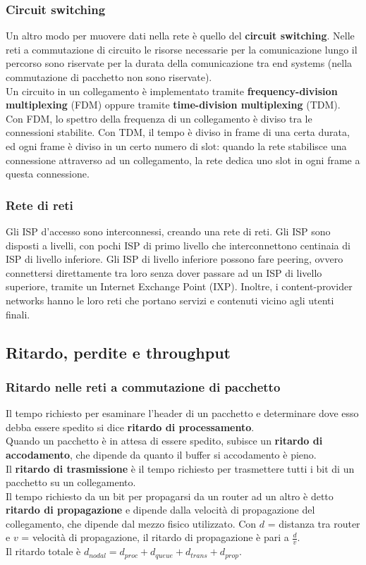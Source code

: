 \documentclass[11pt]{article}
\begin{document}
\subsubsection{Circuit switching}
Un altro modo per muovere dati nella rete è quello del \textbf{circuit switching}. Nelle reti a commutazione di circuito
le risorse necessarie per la comunicazione lungo il percorso sono riservate per la durata della comunicazione tra end
systems (nella commutazione di pacchetto non sono riservate).\\
Un circuito in un collegamento è implementato tramite \textbf{frequency-division multiplexing} (FDM) oppure tramite
\textbf{time-division multiplexing} (TDM). Con FDM, lo spettro della frequenza di un collegamento è diviso tra le
connessioni stabilite. Con TDM, il tempo è diviso in frame di una certa durata, ed ogni frame è diviso in un certo
numero di slot: quando la rete stabilisce una connessione attraverso ad un collegamento, la rete dedica uno slot in ogni
frame a questa connessione.
\subsubsection{Rete di reti}
Gli ISP d'accesso sono interconnessi, creando una rete di reti. Gli ISP sono disposti a livelli, con pochi ISP di primo
livello che interconnettono centinaia di ISP di livello inferiore. Gli ISP di livello inferiore possono fare peering, 
ovvero connettersi direttamente tra loro senza dover passare ad un ISP di livello superiore, tramite un Internet Exchange
Point (IXP). Inoltre, i content-provider networks hanno le loro reti che portano servizi e contenuti vicino agli utenti
finali.
\subsection{Ritardo, perdite e throughput}
\subsubsection{Ritardo nelle reti a commutazione di pacchetto}
Il tempo richiesto per esaminare l'header di un pacchetto e determinare dove esso debba essere spedito si dice
\textbf{ritardo di processamento}.\\
Quando un pacchetto è in attesa di essere spedito, subisce un \textbf{ritardo di accodamento}, che dipende da quanto il
buffer si accodamento è pieno.\\
Il \textbf{ritardo di trasmissione} è il tempo richiesto per trasmettere tutti i bit di un pacchetto su un collegamento.\\
Il tempo richiesto da un bit per propagarsi da un router ad un altro è detto \textbf{ritardo di propagazione} e dipende
dalla velocità di propagazione del collegamento, che dipende dal mezzo fisico utilizzato. Con $d$ = distanza tra router 
e $v$ = velocità di propagazione, il ritardo di propagazione è pari a $\frac{d}{v}$.\\
Il ritardo totale è $d_{nodal} = d_{proc}+d_{queue}+d_{trans}+d_{prop}$.
\end{document}
